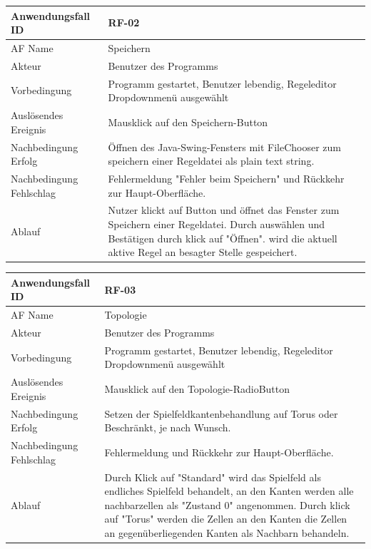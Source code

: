\documentclass[11pt,a4paper]{article}
\begin{document}
     \begin{tabular}[m]{|m{7cm}|m{9cm}|}
          \hline
          Anwendungsfall ID     & RF-02 \\ %
          \hline
          AF Name     &  Speichern \\
          \hline
          Akteur&Benutzer des Programms \\
          \hline
          Vorbedingung&Programm gestartet, Benutzer lebendig, Regeleditor Dropdownmenü ausgewählt\\
          \hline
          Auslösendes Ereignis&Mausklick auf den Speichern-Button\\
          \hline
          Nachbedingung Erfolg&Öffnen des Java-Swing-Fensters mit FileChooser zum speichern einer Regeldatei als plain text string.\\
          \hline
          Nachbedingung Fehlschlag&Fehlermeldung "Fehler beim Speichern" und Rückkehr zur Haupt-Oberfläche.\\
          \hline
          Ablauf&Nutzer klickt auf Button und öffnet das Fenster zum Speichern einer Regeldatei. Durch auswählen und Bestätigen durch klick auf "Öffnen". wird die aktuell aktive Regel an besagter Stelle gespeichert.\\
          \hline
     \end{tabular}
     \par

	\begin{tabular}[m]{|m{7cm}|m{9cm}|}
		\hline
		Anwendungsfall ID     & RF-03 \\ %
		\hline
		AF Name     &  Topologie \\
		\hline
		Akteur&Benutzer des Programms \\
		\hline
		Vorbedingung&Programm gestartet, Benutzer lebendig, Regeleditor Dropdownmenü ausgewählt\\
		\hline
		Auslösendes Ereignis&Mausklick auf den Topologie-RadioButton\\
		\hline
		Nachbedingung Erfolg&Setzen der Spielfeldkantenbehandlung auf Torus oder Beschränkt, je nach Wunsch.\\
		\hline
		Nachbedingung Fehlschlag&Fehlermeldung und Rückkehr zur Haupt-Oberfläche.\\
		\hline
		Ablauf&Durch Klick auf "Standard" wird das Spielfeld als endliches Spielfeld behandelt, an den Kanten werden alle nachbarzellen als "Zustand 0" angenommen.
		Durch klick auf "Torus" werden die Zellen an den Kanten die Zellen an gegenüberliegenden Kanten als Nachbarn behandeln.\\
		\hline
	\end{tabular}
	
\end{document}
